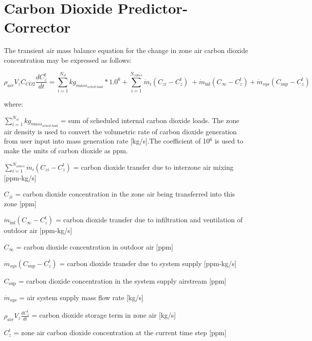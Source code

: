 \section{Carbon Dioxide Predictor-Corrector}\label{carbon-dioxide-predictor-corrector}

The transient air mass balance equation for the change in zone air carbon dioxide concentration may be expressed as follows:

\begin{equation}
{\rho_{air}}{V_z}{C_{CO2}}\frac{{dC_z^t}}{{dt}} = \sum\limits_{i = 1}^{{N_{sl}}} {k{g_{mas{s_{sched\;load}}}}*{{1.0}^6}}  + \sum\limits_{i = 1}^{{N_{zones}}} {{{\dot m}_i}} \left( {{C_{zi}} - C_z^t} \right)\; + {\dot m_{\inf }}\left( {{C_\infty } - C_z^t} \right) + {\dot m_{sys}}\left( {{C_{\sup }} - C_z^t} \right)
\end{equation}

where:

\(\sum\limits_{i = 1}^{{N_{sl}}} {k{g_{mas{s_{sched\;load}}}}}\) = sum of scheduled internal carbon dioxide loads. The zone air density is used to convert the volumetric rate of carbon dioxide generation from user input into mass generation rate {[}kg/s{]}.The coefficient of 10\(^{6}\) is used to make the units of carbon dioxide as ppm.

\(\sum_{i = 1}^{N_{zones}} \dot m_i \left( C_{zi} - C_z^t \right)\) = carbon dioxide transfer due to interzone air mixing {[}ppm-kg/s{]}

\({C_{zi}}\) = carbon dioxide concentration in the zone air being transferred into this zone {[}ppm{]}

\({\dot m_{\inf }}\left( {{C_\infty } - C_z^t} \right)\) = carbon dioxide transfer due to infiltration and ventilation of outdoor air {[}ppm-kg/s{]}

\({C_\infty }\) = carbon dioxide concentration in outdoor air {[}ppm{]}

\({\dot m_{sys}}\left( {{C_{\sup }} - C_z^t} \right)\) = carbon dioxide transfer due to system supply {[}ppm-kg/s{]}

\({C_{\sup }}\) = carbon dioxide concentration in the system supply airstream {[}ppm{]}

\({\dot m_{sys}}\) = air system supply mass flow rate {[}kg/s{]}

\({\rho_{air}}{V_z}\frac{{dC_z^t}}{{dt}}\) = carbon dioxide storage term in zone air {[}kg/s{]}

\(C_z^t\) = zone air carbon dioxide concentration at the current time step {[}ppm{]}

